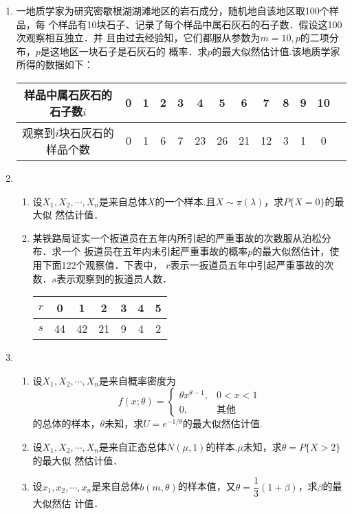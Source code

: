 \documentclass[10pt,a4paper]{article}
\begin{document}
\begin{enumerate}
    \item 一地质学家为研究密歇根湖湖滩地区的岩石成分，随机地自该地区取100个样品，每
    个样品有10块石子、记录了每个样品中属石灰石的石子数．假设这100次观察相互独立．并
    且由过去经验知，它们都服从参数为$m=10,p$的二项分布，$p$是这地区一块石子是石灰石的
    概率．求$p$的最大似然估计值.该地质学家所得的数据如下：
    \renewcommand{\arraystretch}{1.3}
    \begin{table}[H]\centering
        \begin{tabular}{c|cccccccccccc}
        样品中属石灰石的石子数$i$   & 0   & 1  & 2 & 3 & 4 & 5 & 6 & 7 & 8 & 9 & 10 \\ \hline
        观察到$i$块石灰石的样品个数 & 0 & 1 & 6 & 7 & 23 & 26 & 21 & 12 & 3 & 1 & 0 
        \end{tabular}
    \end{table}
    \renewcommand{\arraystretch}{1.0}
    \clearpage



    \item \begin{enumerate}
        \item 设$X_1,X_2,\cdots,X_n$是来自总体$X$的一个样本.且$X\sim \pi(\lambda)$，求$P\{X=0\}$的最大似
        然估计值．
        \item 某铁路局证实一个扳道员在五年内所引起的严重事故的次数服从泊松分布．求一个
        扳道员在五年内未引起严重事故的概率$p$的最大似然估计，使用下面122个观察值．下表中，
        $r$表示一扳道员五年中引起严重事故的次数．$s$表示观察到的扳道员人数．
        \renewcommand{\arraystretch}{1.3}
        \begin{table}[H]\centering
            \begin{tabular}{c|cccccc}
            $r$ & 0 & 1 & 2 & 3 & 4 & 5   \\ \hline
            $s$ & 44 & 42 & 21 & 9 & 4 & 2
            \end{tabular}
        \end{table}
        \renewcommand{\arraystretch}{1.0}
    \end{enumerate}
    \clearpage



    \item \begin{enumerate}
        \item 设$X_1,X_2,\cdots,X_n$是来自概率密度为
        $$f(x;\theta)=\left\{\begin{array}{ll}
            \theta x^{\theta-1}, & 0<x<1\\
            0, & \mbox{其他}
        \end{array}\right.$$
        的总体的样本，$\theta$未知，求$U=e^{-1/\theta}$的最大似然估计值.
        \item 设$X_1,X_2,\cdots,X_n$是来自正态总体$N(\mu,1)$的样本.$\mu$未知，求$\theta=P\{X>2\}$的最大似
        然估计值．
        \item 设$x_1,x_2,\cdots,x_n$是来自总体$b(m,\theta)$的样本值，又$\theta=\dfrac{1}{3}(1+\beta)$，求$\beta$的最大似然估
        计值．
    \end{enumerate}
    \clearpage





\end{enumerate}
\end{document}
